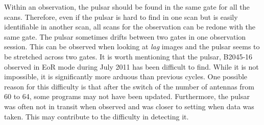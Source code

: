 \documentclass[a4paper,12pt]{article}
\begin{document}
Within an observation, the pulsar should be found in the same gate for all the scans. Therefore, even if the pulsar is hard to find in one scan but is easily identifiable in another scan, all scans for the observation can be redone with the same gate. The pulsar sometimes drifts between two gates in one observation session. This can be observed when looking at \emph{lag} images and the pulsar seems to be stretched across two gates. It is worth mentioning that the pulsar, B2045-16 observed in EoR mode during July 2011 has been difficult to find. While it is not impossible, it is significantly more arduous than previous cycles. One possible reason for this difficulty is that after the switch of the number of antennas from 60 to 64, some programs may not have been updated. Furthermore, the pulsar was often not in transit when observed and was closer to setting when data was taken. This may contribute to the difficulty in detecting it.
\end{document}
